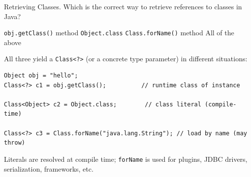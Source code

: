 



\question[4]
Retrieving Classes. Which is the correct way to retrieve references to classes in Java?
\begin{choices}
  \choice \texttt{obj.getClass()} method
  \choice \texttt{Object.class}
  \choice \texttt{Class.forName()} method
  \CorrectChoice All of the above
\end{choices}
\begin{solution}
  All three yield a \texttt{Class<?>} (or a concrete type parameter) in different situations:

\begin{lstlisting}[style=java]
Object obj = "hello";
Class<?> c1 = obj.getClass();          // runtime class of instance

Class<Object> c2 = Object.class;        // class literal (compile-time)

Class<?> c3 = Class.forName("java.lang.String"); // load by name (may throw)
\end{lstlisting}

  Literals are resolved at compile time; \texttt{forName} is used for plugins, JDBC drivers, serialization, frameworks, etc.
\end{solution}

